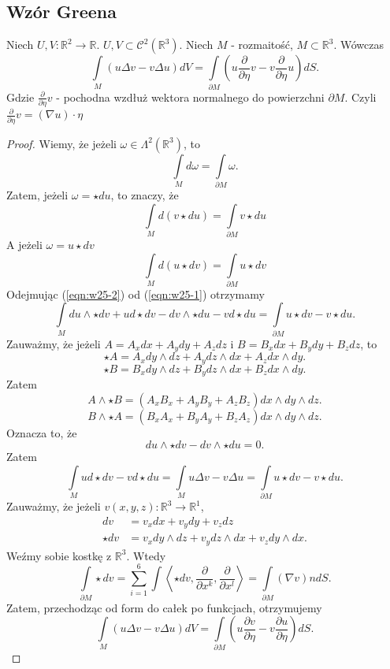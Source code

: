 \documentclass[../main.tex]{subfiles}
\begin{document}
\subsection{\color{green}Wzór Greena}
\begin{tw}
Niech $U, V: \mathbb{R}^2 \to \mathbb{R}$. $U, V \subset \mathcal{C}^2(\mathbb{R}^3)$. Niech $M$ - rozmaitość, $M\subset\mathbb{R}^3$. Wówczas
\[
    \int\limits_M \left(u \Delta v - v \Delta u\right)dV = \int\limits_{\partial M}\left( u \frac{\partial }{\partial \eta} v - v \frac{\partial }{\partial \eta} u\right)dS
.\]
Gdzie $\frac{\partial }{\partial \eta} v$ - pochodna wzdłuż wektora normalnego do powierzchni $\partial M$. Czyli $\frac{\partial }{\partial \eta} v = \left( \nabla u \right)\cdot \eta$
\end{tw}
\begin{proof}
    Wiemy, że jeżeli $\omega\in\Lambda^2(\mathbb{R}^3)$, to
    \[
        \int\limits_M d\omega = \int\limits_{\partial M}\omega
    .\]
Zatem, jeżeli $\omega = \star du$, to znaczy, że
\begin{equation}
    \label{eqn:w25-1}
    \int\limits_M d(v\star du) = \int\limits_{\partial M}v\star du\tag{A}
\end{equation}
A jeżeli $\omega = u\star dv$
\begin{equation}
    \label{eqn:w25-2}
     \int\limits_M d(u\star dv) = \int\limits_{\partial M}u\star dv\tag{B}
\end{equation}
    Odejmując (\ref{eqn:w25-2}) od (\ref{eqn:w25-1}) otrzymamy
    \[
        \int\limits_M du\land \star dv + u d\star dv - dv\land \star du - v d\star du = \int\limits_{\partial M}u\star dv - v\star du
    .\]
Zauważmy, że jeżeli $A = A_xdx + A_ydy + A_zdz$ i  $B = B_xdx + B_ydy + B_zdz$, to
 \[
    \star A = A_xdy\land dz + A_y dz\land dx + A_z dx\land dy
.\]
\[
    \star B = B_xdy\land dz + B_y dz\land dx + B_z dx\land dy
.\]
Zatem
\[
    A\land \star B = \left( A_xB_x + A_yB_y + A_zB_z \right) dx\land dy\land dz
.\]
\[
    B\land \star A = \left( B_xA_x + B_yA_y + B_zA_z \right) dx\land dy\land dz
.\]
Oznacza to, że
\[
    du\land \star dv - dv\land\star du = 0
.\]
Zatem
\[
    \int\limits_M ud\star dv - vd\star du = \int\limits_M u\Delta v - v \Delta u = \int\limits_{\partial M} u\star dv - v\star du
.\]
Zauważmy, że jeżeli $v(x,y,z): \mathbb{R}^3\to \mathbb{R}^1$,
\begin{align*}
    dv &= v_xdx + v_ydy + v_zdz\\
    \star dv &= v_xdy\land dz + v_ydz\land dx + v_zdy\land dx
.\end{align*}
Weźmy sobie kostkę z $\mathbb{R}^3$. Wtedy
\[
    \int\limits_{\partial M}\star dv = \sum_{i=1}^{6} \int \left<\star dv, \frac{\partial }{\partial x^k} , \frac{\partial }{\partial x^l}  \right> = \int\limits_{\partial M}\left( \nabla v \right) n dS
.\]
Zatem, przechodząc od form do całek po funkcjach, otrzymujemy
\[
    \int\limits_M\left( u\Delta v - v\Delta u \right) dV = \int\limits_{\partial M}\left( u \frac{\partial v}{\partial \eta} - v \frac{\partial u}{\partial \eta}  \right) dS
.\]
\end{proof}
\end{document}
